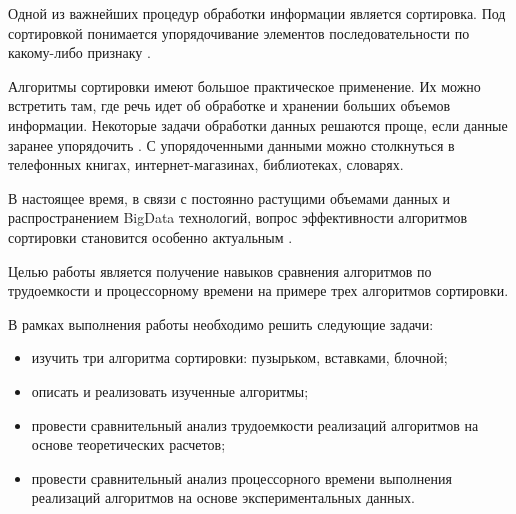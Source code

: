 
Одной из важнейших процедур обработки информации является сортировка. 
Под сортировкой понимается упорядочивание элементов последовательности по какому-либо признаку \cite{book_shagbazyan}.

Алгоритмы сортировки имеют большое практическое применение. 
Их можно встретить там, где речь идет об обработке и хранении больших объемов информации. Некоторые задачи обработки данных решаются проще, если данные заранее упорядочить \cite{article_sortings}. 
С упорядоченными данными можно столкнуться в телефонных книгах, интернет-магазинах, библиотеках, словарях.

В настоящее время, в связи с постоянно растущими объемами данных и распространением BigData технологий, вопрос эффективности алгоритмов сортировки становится особенно актуальным \cite{big_data}.

Целью работы является получение навыков сравнения алгоритмов по трудоемкости и процессорному времени на примере трех алгоритмов сортировки.

В рамках выполнения работы необходимо решить следующие задачи:

\begin{itemize}
	\item изучить три алгоритма сортировки: пузырьком, вставками, блочной;
	\item описать и реализовать изученные алгоритмы;
	\item провести сравнительный анализ трудоемкости реализаций алгоритмов на основе теоретических расчетов;
	\item провести сравнительный анализ процессорного времени выполнения реализаций алгоритмов на основе экспериментальных данных.
\end{itemize}